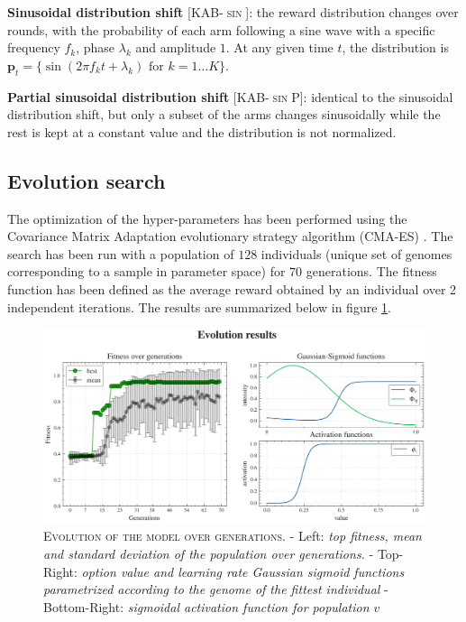 \noindent \textbf{Sinusoidal distribution shift} [\textsc{KAB-$\sin$}]: the reward distribution changes over rounds, with the probability of each arm following a sine wave with a specific frequency $f_{k}$, phase $\lambda_{k}$ and amplitude $1$. At any given time $t$, the distribution is $\mathbf{p}_{t}=\{\sin(2\pi f_{k}
t+\lambda_{k})\text{  for }k=1\ldots K\}$.

\noindent \textbf{Partial sinusoidal distribution shift} [\textsc{KAB-$\sin$P}]: identical to the sinusoidal distribution shift, but only a subset of the arms changes sinusoidally while the rest is kept at a constant value and the distribution is not normalized.


\subsection{Evolution search}
The optimization of the hyper-parameters has been performed using the Covariance Matrix Adaptation evolutionary strategy algorithm (CMA-ES) \cite{igelCovarianceMatrixAdaptation2007}.
The search has been run with a population of $128$ individuals (unique set of genomes corresponding to a sample in parameter space) for $70$ generations. The fitness function has been defined as the average reward obtained by an individual over 2 independent iterations.
The results are summarized below in figure \ref{fig:evolution}.

\begin{figure}[H]
    \centering
    \includegraphics[width=1.0\textwidth]{figures/evolution_plot.png}
    \caption{\textsc{Evolution of the model over generations.} - Left: \textit{top fitness, mean and standard deviation of the population over generations.} - Top-Right: \textit{option value and learning rate Gaussian sigmoid functions parametrized according to the genome of the fittest individual} -
    Bottom-Right: \textit{sigmoidal activation function for population $v$}}
    \label{fig:evolution}
\end{figure}

